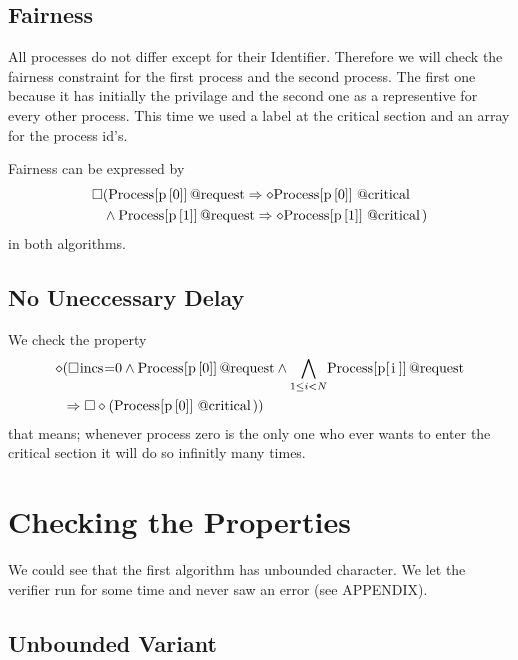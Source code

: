 \documentclass{llncs}
\begin{document}
\subsection{Fairness}

All processes do not differ except for their Identifier. Therefore we will check the fairness constraint for the first process and the second process.
The first one because it has initially the privilage and the second one as a representive for every other process.
This time we used a label at the critical section and an array for the process id's.

Fairness can be expressed by
\begin{eqnarray}
    \square & ( \text{\lstinline|Process[p[0]]@request|} \Rightarrow \diamond \text{\lstinline|Process[p[0]]@critical|} \\
    &\land \text{\lstinline|Process[p[1]]@request|}\Rightarrow \diamond \text{\lstinline|Process[p[1]]@critical|})
\end{eqnarray}
in both algorithms.

\subsection{No Uneccessary Delay}

We check the property
\begin{eqnarray}
    \diamond & ( \square \text{\lstinline|incs|=0} \land \text{\lstinline|Process[p[0]]@request|} \land \underset{1\leq i < N}{\bigwedge} \text{\lstinline|Process[p[i]]@request|}\\
    &\Rightarrow \square \diamond(\text{\lstinline|Process[p[0]]@critical|}))
\end{eqnarray}
that means; whenever process zero is the only one who ever wants to enter the critical section it will do so infinitly many times.

\section{Checking the Properties}

We could see that the first algorithm has unbounded character. We let the verifier run for some time
and never saw an error (see APPENDIX).

\subsection{Unbounded Variant}
\end{document}
